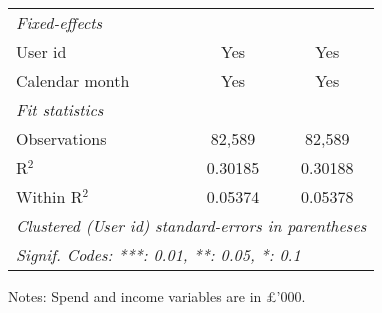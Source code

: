 \begin{table}[htbp]
\begin{threeparttable}[b]
\begin{tabular}{lcc}
         \midrule
         \emph{Fixed-effects}\\
         User id             & Yes            & Yes\\  
         Calendar month      & Yes            & Yes\\  
         \midrule
         \emph{Fit statistics}\\
         Observations        & 82,589         & 82,589\\  
         R$^2$               & 0.30185        & 0.30188\\  
         Within R$^2$        & 0.05374        & 0.05378\\  
         \midrule \midrule
         \multicolumn{3}{l}{\emph{Clustered (User id) standard-errors in parentheses}}\\
         \multicolumn{3}{l}{\emph{Signif. Codes: ***: 0.01, **: 0.05, *: 0.1}}\\
      \end{tabular}
      
      \begin{tablenotes}\footnotesize
         \item Notes: Spend and income variables are in \pounds'000.
      \end{tablenotes}
   \end{threeparttable}
\end{table}



